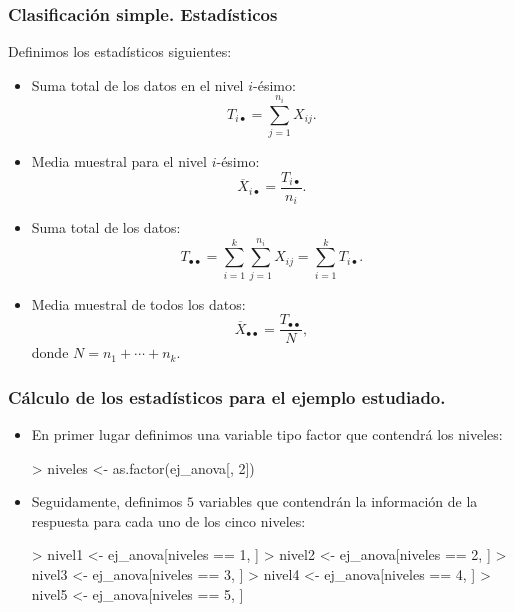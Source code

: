 \begin{frame}
\frametitle{Clasificación simple. Estadísticos}
Definimos los estadísticos siguientes:
\begin{itemize}
\item<2-> Suma total de los datos en el nivel $i$-ésimo: $$T_{i\bullet} =\sum_{j=1}^{n_i} X_{ij}.$$
\item<3-> Media muestral para el nivel $i$-ésimo: $$\overline{X}_{i\bullet} = \frac{T_{i\bullet}}{n_i}.$$
\item<4-> Suma total de los datos: $$T_{\bullet\bullet}=\sum_{i=1}^k \sum_{j=1}^{n_i} X_{ij} =\sum_{i=1}^k T_{i\bullet}.$$
\item<5-> Media muestral de todos los datos: $$\overline{X}_{\bullet\bullet} =\frac{T_{\bullet\bullet}}{N},$$ donde $N=n_1+\cdots + n_k$.
\end{itemize}
\end{frame}
\begin{frame}[fragile]
\frametitle{Cálculo de los estadísticos para el ejemplo estudiado.}
\begin{itemize}
\item<2-> En primer lugar definimos una variable tipo factor que contendrá los niveles:

\begin{Schunk}
\begin{Sinput}
> niveles <- as.factor(ej_anova[, 2])
\end{Sinput}
\end{Schunk}

\item<3-> Seguidamente, definimos $5$ variables que contendrán la información de la respuesta para cada uno de los cinco niveles:

\begin{Schunk}
\begin{Sinput}
> nivel1 <- ej_anova[niveles == 1, ]
> nivel2 <- ej_anova[niveles == 2, ]
> nivel3 <- ej_anova[niveles == 3, ]
> nivel4 <- ej_anova[niveles == 4, ]
> nivel5 <- ej_anova[niveles == 5, ]
\end{Sinput}
\end{Schunk}

\end{itemize}
\end{frame}

